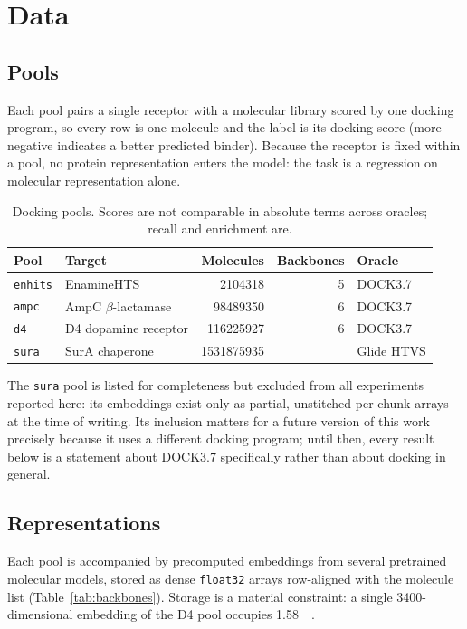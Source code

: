 \section{Data}
\label{sec:data}

\subsection{Pools}

Each pool pairs a single receptor with a molecular library scored by one
docking program, so every row is one molecule and the label is its docking
score (more negative indicates a better predicted binder). Because the receptor
is fixed within a pool, no protein representation enters the model: the task is
a regression on molecular representation alone.

\begin{table}[t]
\centering
\caption{Docking pools. Scores are not comparable in absolute terms across
oracles; recall and enrichment are.}
\label{tab:pools}
\small
\begin{tabular}{llrrl}
\toprule
Pool & Target & Molecules & Backbones & Oracle \\
\midrule
\texttt{enhits} & EnamineHTS                & \num{2104318}    & 5 & DOCK3.7 \\
\texttt{ampc}   & AmpC $\beta$-lactamase    & \num{98489350}   & 6 & DOCK3.7 \\
\texttt{d4}     & D4 dopamine receptor      & \num{116225927}  & 6 & DOCK3.7 \\
\texttt{sura}   & SurA chaperone            & \num{1531875935} & \todo{--} & Glide HTVS \\
\bottomrule
\end{tabular}
\end{table}

The \texttt{sura} pool is listed for completeness but excluded from all
experiments reported here: its embeddings exist only as partial, unstitched
per-chunk arrays at the time of writing. Its inclusion matters for a future
version of this work precisely because it uses a different docking program;
until then, every result below is a statement about DOCK3.7 specifically rather
than about docking in general.

\subsection{Representations}

Each pool is accompanied by precomputed embeddings from several pretrained
molecular models, stored as dense \texttt{float32} arrays row-aligned with the
molecule list (Table~\ref{tab:backbones}). Storage is a material constraint: a
single \num{3400}-dimensional embedding of the D4 pool occupies
\SI{1.58}{\tera\byte}.

